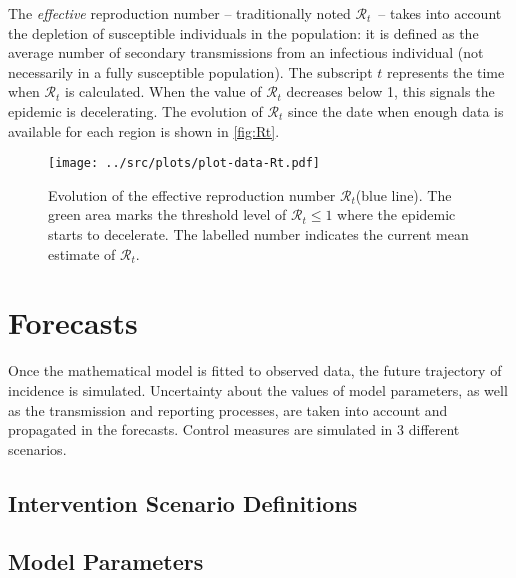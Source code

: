 \documentclass[10pt]{article}
\newcommand{\Rt}{\ensuremath{\mathcal{R}_t}\xspace}
\begin{document}
The \emph{effective} reproduction number  -- traditionally noted \Rt \, -- takes into account the depletion of susceptible individuals in the population: it is defined as the average number of secondary transmissions from an infectious individual (not necessarily in a fully susceptible population). The subscript $t$ represents the time when \Rt is calculated.
When the value of \Rt decreases below 1, this signals the epidemic is decelerating.
The evolution of \Rt since the date when enough data is available for each region is shown in \autoref{fig:Rt}. 



\begin{figure}[h!]
\begin{center}
\texttt{[image: ../src/plots/plot-data-Rt.pdf]}
\caption{Evolution of the effective reproduction number \Rt (blue line). The green area marks the threshold level of $\Rt \leq 1$ where the epidemic starts to decelerate. The labelled number indicates the current mean estimate of \Rt.}
\label{fig:Rt}
\end{center}
\end{figure}





\newpage


\section*{Forecasts}



Once the mathematical model is fitted to observed data, the future trajectory of incidence is simulated. Uncertainty about the values of model parameters, as well as the transmission and reporting processes, are taken into account and propagated in the forecasts. 
Control measures are simulated in 3 different scenarios.



\subsection*{Intervention Scenario Definitions}



\vspace*{5mm}

\subsection*{Model Parameters}
\end{document}
